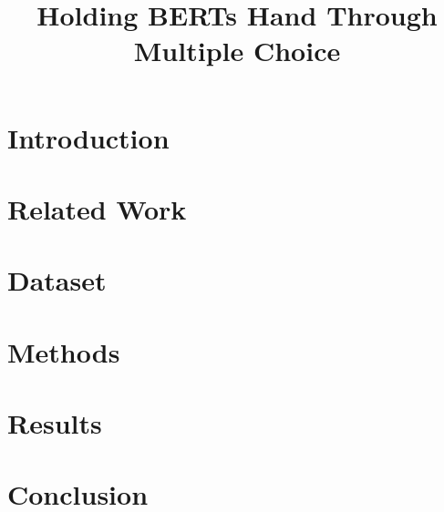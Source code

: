 \documentclass[10pt, a4paper]{article}
\title{Holding BERTs Hand Through Multiple Choice}
\begin{document}
\maketitleabstract

\section{Introduction} \label{intro}


\section{Related Work}
 \label{related-work}

\section{Dataset} \label{dataset}


\section{Methods} \label{approach}




\section{Results} \label{results}


\section{Conclusion}
 \label{conclusion}


 
\end{document}
